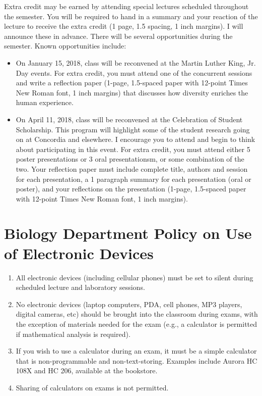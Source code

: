 \documentclass{tufte-handout}
\begin{document}
\begin{fullwidth}
Extra credit may be earned by attending special lectures scheduled throughout the semester.  You will be required to hand in a summary and your reaction of the lecture to receive the extra credit (1 page, 1.5 spacing, 1 inch margins).  I will announce these in advance.  There will be several opportunities during the semester.  Known opportunities include:

\begin{itemize}
\item On January 15, 2018, class will be reconvened at the Martin Luther King, Jr. Day events. For extra credit, you must attend one of the concurrent sessions and write a reflection paper (1-page, 1.5-spaced paper with 12-point Times New Roman font, 1 inch margins) that discusses how diversity enriches the human experience. 
\item On April 11, 2018, class will be reconvened at the Celebration of Student Scholarship.  This program will highlight some of the student research going on at Concordia and elsewhere.  I encourage you to attend and begin to think about participating in this event. For extra credit, you must attend either 5 poster presentations or 3 oral presentationsm, or some combination of the two.  Your reflection paper must include complete title, authors and session for each presentation, a 1 paragraph summary for each presentation (oral or poster), and your reflections on the presentation (1-page, 1.5-spaced paper with 12-point Times New Roman font, 1 inch margins).  	
\end{itemize}

\section{Biology Department Policy on Use of Electronic Devices}

\begin{enumerate}
\item All electronic devices (including cellular phones) must be set to silent during scheduled lecture and laboratory sessions.
\item No electronic devices (laptop computers, PDA, cell phones, MP3 players, digital cameras, etc) should be brought into the classroom during exams, with the exception of materials needed for the exam (e.g., a calculator is permitted if mathematical analysis is required).
\item If you wish to use a calculator during an exam, it must be a simple calculator that is non-programmable and non-text-storing. Examples include Aurora HC 108X and HC 206, available at the bookstore. 
\item Sharing of calculators on exams is not permitted.
\end{enumerate}


\end{fullwidth}
\end{document}
